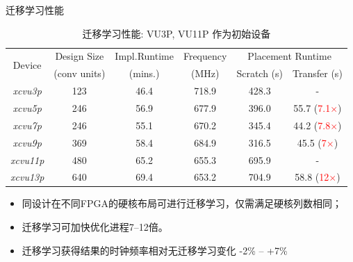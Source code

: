 \documentclass[10pt]{beamer}
\begin{document}
\begin{frame}{迁移学习性能}

  \begin{table}[h!]
    \caption{迁移学习性能: VU3P, VU11P 作为初始设备}
    \label{table:port}
    \centering
    \begin{adjustbox}{width=\columnwidth,center}
    \begin{tabular}{c|c c c c c}
      \toprule
  \multirow{2}{*}{Device}     & Design Size 		& Impl.Runtime 		& Frequency 	 & \multicolumn{2}{c}{Placement Runtime}    			\\ \cline{5-6}
                                 & (conv units)		& (mins.)				& (MHz)			 & 	Scratch (s)			& 	Transfer (s)				\\
      \midrule
      \emph{xcvu3p}  			& 123				&	46.4			& 718.9			 & 428.3				& - 							\\
      \emph{xcvu5p}  			& 246				&   56.9				& 677.9	 		 & 396.0				& 55.7 	(\textcolor{red}{7.1$\times$})							\\
      \emph{xcvu7p}  			& 246			    &   55.1				& 670.2	 		 & 345.4				& 44.2 	(\textcolor{red}{7.8$\times$})							\\
      \emph{xcvu9p}  			& 369	   			&   58.4				& 684.9	 		 & 316.5				& 45.5 	(\textcolor{red}{7$\times$})							\\ 
      \midrule
      \emph{xcvu11p} 			& 480	      	    &	65.2          	& 655.3	 		 & 695.9				& -								\\	
      \emph{xcvu13p} 			& 640        	    & 	69.4   			& 653.2	 		 & 704.9				& 58.8	(\textcolor{red}{12$\times$})			\\
      \bottomrule
    \end{tabular}
    \vspace{-0.1in}
    \end{adjustbox}
  \end{table}

  {\fontsize{8}{12}\selectfont
  \begin{itemize}
    \item 同设计在不同FPGA的硬核布局可进行迁移学习，仅需满足\alert{硬核列数相同}；
    \item 迁移学习可加快优化进程\alert{7--12}倍。
    \item 迁移学习获得结果的时钟频率相对无迁移学习变化 \alert{-2\% -- +7\%}
  \end{itemize}
  }
  
\end{frame}
\end{document}
